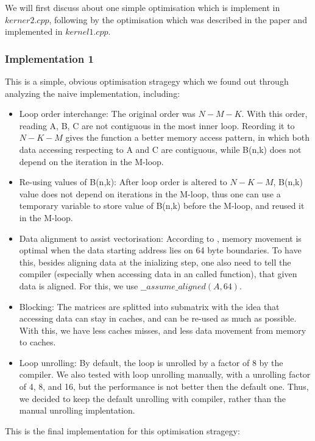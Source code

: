 \documentclass[article]{scrartcl}
\begin{document}
We will first discuss about one simple optimisation which is implement in $kerner2.cpp$, following by the optimisation which was described in the paper \cite{Goto08} and implemented in $kernel1.cpp$.

\subsubsection{Implementation 1}
This is a simple, obvious optimisation stragegy which we found out through analyzing the naive implementation, including:
\begin{itemize}
	\item Loop order interchange: The original order was $N-M-K$. With this order, reading A, B, C are not contiguous in the most inner loop. Reording it to $N-K-M$ gives the function a better memory access pattern, in which both data accessing respecting to A and C are contiguous, while B(n,k) does not depend on the iteration in the M-loop.
	\item Re-using values of B(n,k): After loop order is altered to $N-K-M$, B(n,k) value does not depend on iterations in the M-loop, thus one can use a temporary variable to store value of B(n,k) before the M-loop, and reused it in the M-loop. 
	\item Data alignment to assist vectorisation: According to \cite{align13}, memory movement is optimal when the data starting address lies on 64 byte boundaries. To have this, besides aligning data at the inializing step, one also need to tell the compiler (especially when accessing data in an called function), that given data is aligned. For this, we use $\_\_assume\_aligned(A,64)$.
	\item Blocking: The matrices are splitted into submatrix with the idea that accessing data can stay in caches, and can be re-used as much as possible. With this, we have less caches misses, and less data movement from memory to caches.
	\item Loop unrolling: By default, the loop is unrolled by a factor of 8 by the compiler. We also tested with loop unrolling manually, with a unrolling factor of 4, 8, and 16, but the performance is not better then the default one. Thus, we decided to keep the default unrolling with compiler, rather than the manual unrolling implentation. 
\end{itemize} 
This is the final implementation for this optimisation stragegy:
\end{document}
